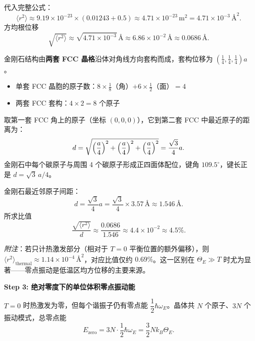 \begin{derivationbox}[标准解题过程]
代入完整公式：
\begin{equation}
\langle r^2\rangle \approx 9.19\times10^{-23}\times(0.01243+0.5) \approx 4.71\times10^{-23}\,\mathrm{m^2} = 4.71\times10^{-3}\,\text{\AA}^2.
\end{equation}
方均根位移
\begin{equation}
\sqrt{\langle r^2\rangle} \approx \sqrt{4.71\times10^{-3}}\,\text{\AA} \approx 6.86\times10^{-2}\,\text{\AA} \approx 0.0686\,\text{\AA}.
\end{equation}

\begin{insightbox}
金刚石结构由\textbf{两套 FCC 晶格}沿体对角线方向套构而成，套构位移为 $(\frac14,\frac14,\frac14)a$。
\begin{itemize}
    \item 单套 FCC 晶胞的原子数：$8\times\frac18$（角）$+6\times\frac12$（面）$=4$
    \item 两套 FCC 套构：$4\times2=8$ 个原子
\end{itemize}

取第一套 FCC 角上的原子（坐标 $(0,0,0)$），它到第二套 FCC 中最近原子的距离为：
\[
d = \sqrt{\Bigl(\frac{a}{4}\Bigr)^2+\Bigl(\frac{a}{4}\Bigr)^2+\Bigl(\frac{a}{4}\Bigr)^2} = \frac{\sqrt3}{4}a.
\]
金刚石中每个碳原子与周围 4 个碳原子形成正四面体配位，键角 $109.5^\circ$，键长正是 $d=\sqrt3\,a/4$。
\end{insightbox}

金刚石最近邻原子间距：
\begin{equation}
\boxed{d = \frac{\sqrt3}{4}a = \frac{\sqrt3}{4}\times3.57\,\text{\AA} \approx 1.546\,\text{\AA}.}
\end{equation}
所求比值
\begin{equation}
\boxed{\frac{\sqrt{\langle r^2\rangle}}{d} \approx \frac{0.0686}{1.546} \approx 4.4\times10^{-2} \approx 4.5\%.}
\end{equation}

\textit{附注}：若只计热激发部分（相对于 $T=0$ 平衡位置的额外偏移），则 $\langle r^2\rangle_{\text{thermal}}\approx1.14\times10^{-4}\,\text{\AA}^2$，对应比值仅约 $0.69\%$。这一区别在 $\Theta_E\gg T$ 时尤为显著——零点振动是低温区均方位移的主要来源。

\textbf{Step 3: 绝对零度下的单位体积零点振动能}

$T=0$ 时热激发为零，但每个谐振子仍有零点能 $\dfrac12\hbar\omega_E$。晶体共 $N$ 个原子、$3N$ 个振动模式，总零点能
\begin{equation}
E_{\text{zero}} = 3N\cdot\frac12\hbar\omega_E = \frac32 Nk_B\Theta_E.
\end{equation}


\end{derivationbox}
